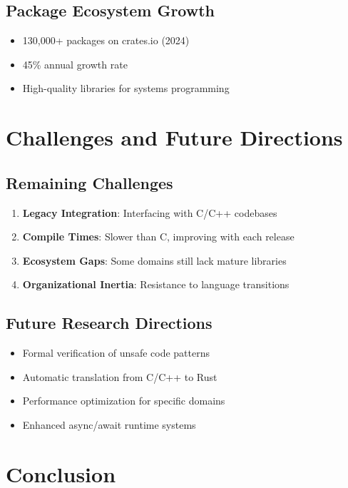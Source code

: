 \documentclass[11pt]{article}
\begin{document}
\subsection{Package Ecosystem Growth}
\begin{itemize}
    \item 130,000+ packages on crates.io (2024)
    \item 45\% annual growth rate
    \item High-quality libraries for systems programming
\end{itemize}

\section{Challenges and Future Directions}

\subsection{Remaining Challenges}
\begin{enumerate}
    \item \textbf{Legacy Integration}: Interfacing with C/C++ codebases
    \item \textbf{Compile Times}: Slower than C, improving with each release
    \item \textbf{Ecosystem Gaps}: Some domains still lack mature libraries
    \item \textbf{Organizational Inertia}: Resistance to language transitions
\end{enumerate}

\subsection{Future Research Directions}
\begin{itemize}
    \item Formal verification of unsafe code patterns
    \item Automatic translation from C/C++ to Rust
    \item Performance optimization for specific domains
    \item Enhanced async/await runtime systems
\end{itemize}

\section{Conclusion}
\end{document}
